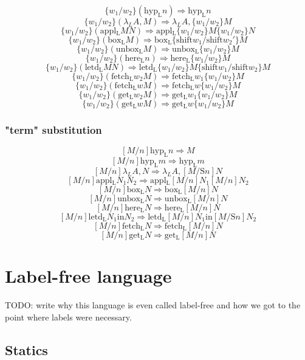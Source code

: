 \documentclass[12pt]{article}
\begin{document}
$$ \{ w_1 / w_2 \} (\mathrm{hyp_L} n) \Rightarrow \mathrm{hyp_L} n $$  
$$ \{ w_1 / w_2 \} (\lambda_L A, M) \Rightarrow \lambda_L A, \{w_1 / w_2 \} M $$  
$$ \{ w_1 / w_2 \} (\mathrm{appl_L} M N) \Rightarrow \mathrm{appl_L}  \{w_1 / w_2 \}M \{w_1 / w_2 \} N$$  
$$ \{ w_1 / w_2 \} (\mathrm{box_L} M) \Rightarrow 
			   \mathrm{box_L} \{\mathrm{shift} w_1 / \mathrm{shift} w_2' \} M $$  
$$ \{ w_1 / w_2 \} (\mathrm{unbox_L} M) \Rightarrow \mathrm{unbox_L} \{w_1 / w_2 \} M $$  
$$ \{ w_1 / w_2 \} (\mathrm{here_L} n) \Rightarrow \mathrm{here_L} \{w_1 / w_2 \} M $$  
$$ \{ w_1 / w_2 \} (\mathrm{letd_L} M N) \Rightarrow 
			    \mathrm{letd_L} \{w_1 / w_2 \}M \{\mathrm{shift} w_1 / \mathrm{shift} w_2 \} M$$  
$$ \{ w_1 / w_2 \} (\mathrm{fetch_L} w_2 M) \Rightarrow \mathrm{fetch_L} w_1 \{w_1 / w_2 \} M $$  
$$ \{ w_1 / w_2 \} (\mathrm{fetch_L} w M) \Rightarrow \mathrm{fetch_L} w \{w_1 / w_2 \} M $$  
$$ \{ w_1 / w_2 \} (\mathrm{get_L} w_2 M) \Rightarrow \mathrm{get_L} w_1 \{w_1 / w_2 \} M $$  
$$ \{ w_1 / w_2 \} (\mathrm{get_L} w M) \Rightarrow \mathrm{get_L} w \{w_1 / w_2 \} M $$ 

\subsubsection{"term" substitution}

$$ [ M / n ] \mathrm{hyp_L} n \Rightarrow M $$
$$ [ M / n ] \mathrm{hyp_L} m \Rightarrow \mathrm{hyp_L} m $$
$$ [ M / n ] \lambda_L A, N \Rightarrow \lambda_L A, [M / \mathrm{S } n] N$$
$$ [ M / n ] \mathrm{appl_L} N_1 N_2 \Rightarrow \mathrm{appl_L} [M / n] N_1 [M / n] N_2$$
$$ [ M / n ] \mathrm{box_L} N \Rightarrow \mathrm{box_L} [M / n] N $$
$$ [ M / n ] \mathrm{unbox_L} N \Rightarrow \mathrm{unbox_L} [M / n ]N $$
$$ [ M / n ] \mathrm{here_L} N \Rightarrow \mathrm{here_L} [M / n ]N $$
$$ [ M / n ] \mathrm{letd_L} N_1 \mathrm{in} N_2 \Rightarrow \mathrm{letd_L} [M / n ]N_1 \mathrm{ in } [M/\mathrm{S } n]N_2 $$
$$ [ M / n ] \mathrm{fetch_L} N \Rightarrow \mathrm{fetch_L} [M / n ]N $$
$$ [ M / n ] \mathrm{get_L} N \Rightarrow \mathrm{get_L} [M / n ]N $$

\section{Label-free language}
TODO: write why this language is even called label-free and how we got to the point where labels were necessary.

\subsection{Statics}
\end{document}
